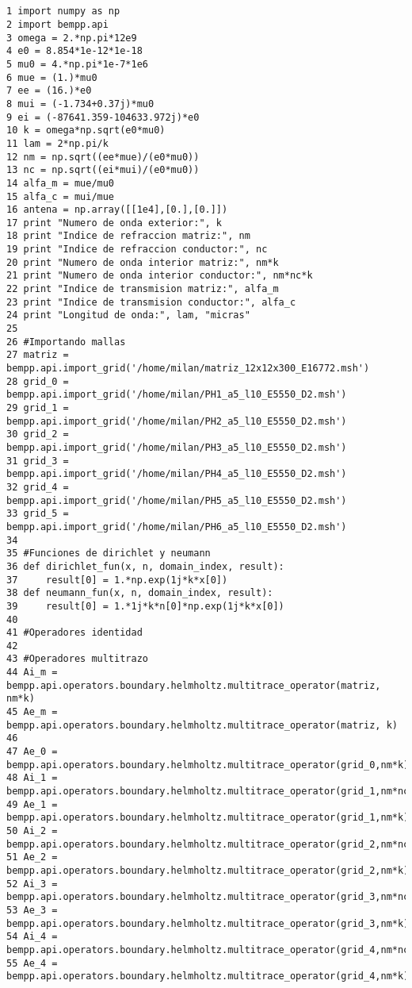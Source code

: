 \documentclass[12pt,letterpaper]{article}
\numberwithin{equation}{section}
\begin{document}
\begin{lstlisting}


1 import numpy as np
2 import bempp.api
3 omega = 2.*np.pi*12e9
4 e0 = 8.854*1e-12*1e-18
5 mu0 = 4.*np.pi*1e-7*1e6
6 mue = (1.)*mu0
7 ee = (16.)*e0
8 mui = (-1.734+0.37j)*mu0
9 ei = (-87641.359-104633.972j)*e0
10 k = omega*np.sqrt(e0*mu0)
11 lam = 2*np.pi/k
12 nm = np.sqrt((ee*mue)/(e0*mu0))
13 nc = np.sqrt((ei*mui)/(e0*mu0))
14 alfa_m = mue/mu0
15 alfa_c = mui/mue
16 antena = np.array([[1e4],[0.],[0.]])
17 print "Numero de onda exterior:", k
18 print "Indice de refraccion matriz:", nm
19 print "Indice de refraccion conductor:", nc
20 print "Numero de onda interior matriz:", nm*k
21 print "Numero de onda interior conductor:", nm*nc*k
22 print "Indice de transmision matriz:", alfa_m
23 print "Indice de transmision conductor:", alfa_c
24 print "Longitud de onda:", lam, "micras"
25 
26 #Importando mallas
27 matriz = bempp.api.import_grid('/home/milan/matriz_12x12x300_E16772.msh')
28 grid_0 = bempp.api.import_grid('/home/milan/PH1_a5_l10_E5550_D2.msh')
29 grid_1 = bempp.api.import_grid('/home/milan/PH2_a5_l10_E5550_D2.msh')
30 grid_2 = bempp.api.import_grid('/home/milan/PH3_a5_l10_E5550_D2.msh')
31 grid_3 = bempp.api.import_grid('/home/milan/PH4_a5_l10_E5550_D2.msh')
32 grid_4 = bempp.api.import_grid('/home/milan/PH5_a5_l10_E5550_D2.msh')
33 grid_5 = bempp.api.import_grid('/home/milan/PH6_a5_l10_E5550_D2.msh')
34 
35 #Funciones de dirichlet y neumann
36 def dirichlet_fun(x, n, domain_index, result):
37     result[0] = 1.*np.exp(1j*k*x[0])
38 def neumann_fun(x, n, domain_index, result):
39     result[0] = 1.*1j*k*n[0]*np.exp(1j*k*x[0])
40 
41 #Operadores identidad
42 
43 #Operadores multitrazo
44 Ai_m = bempp.api.operators.boundary.helmholtz.multitrace_operator(matriz, nm*k)
45 Ae_m = bempp.api.operators.boundary.helmholtz.multitrace_operator(matriz, k)
46 
47 Ae_0 = bempp.api.operators.boundary.helmholtz.multitrace_operator(grid_0,nm*k)
48 Ai_1 = bempp.api.operators.boundary.helmholtz.multitrace_operator(grid_1,nm*nc*k)
49 Ae_1 = bempp.api.operators.boundary.helmholtz.multitrace_operator(grid_1,nm*k)
50 Ai_2 = bempp.api.operators.boundary.helmholtz.multitrace_operator(grid_2,nm*nc*k)
51 Ae_2 = bempp.api.operators.boundary.helmholtz.multitrace_operator(grid_2,nm*k)
52 Ai_3 = bempp.api.operators.boundary.helmholtz.multitrace_operator(grid_3,nm*nc*k)
53 Ae_3 = bempp.api.operators.boundary.helmholtz.multitrace_operator(grid_3,nm*k)
54 Ai_4 = bempp.api.operators.boundary.helmholtz.multitrace_operator(grid_4,nm*nc*k)
55 Ae_4 = bempp.api.operators.boundary.helmholtz.multitrace_operator(grid_4,nm*k)

\end{lstlisting}
\end{document}

